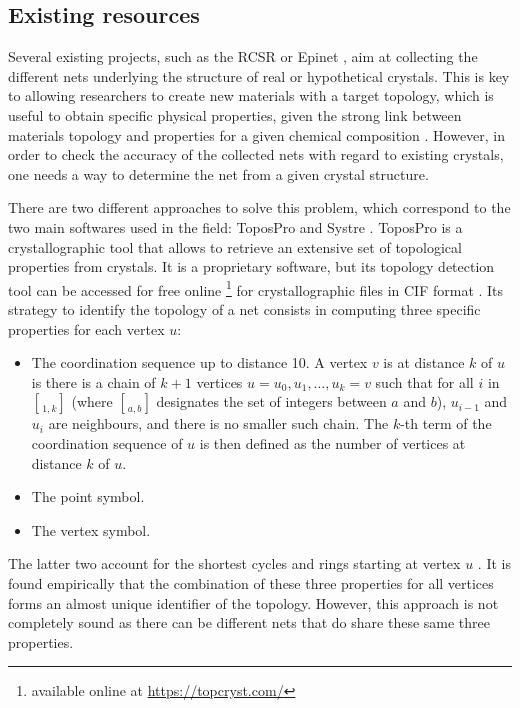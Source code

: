\documentclass[main.tex]{subfiles}
\begin{document}
\subsection{Existing resources}

Several existing projects, such as the RCSR \autocite{RCSR} or Epinet \autocite{Epinet0,EPINET}, aim at collecting the different nets underlying the structure of real or hypothetical crystals. This is key to allowing researchers to create new materials with a target topology, which is useful to obtain specific physical properties, given the strong link between materials topology and properties for a given chemical composition \autocite{ZIF}. However, in order to check the accuracy of the collected nets with regard to existing crystals, one needs a way to determine the net from a given crystal structure.

There are two different approaches to solve this problem, which correspond to the two main softwares used in the field: ToposPro \autocite{ToposPro,TOPOS} and Systre \autocite{Systre}. ToposPro is a crystallographic tool that allows to retrieve an extensive set of topological properties from crystals. It is a proprietary software, but its topology detection tool can be accessed for free online \autocite{TopCryst}\footnote{available online at \url{https://topcryst.com/}} for crystallographic files in CIF format \autocite{CIF}. Its strategy to identify the topology of a net consists in computing three specific properties for each vertex $u$:
\label{coordinationsequence}
\begin{itemize}
	\item The coordination sequence up to distance 10.
	A vertex $v$ is at distance $k$ of $u$ is there is a chain of $k+1$ vertices $u = u_0,u_1,\ldots,u_k = v$ such that for all $i$ in $\brack{1,k}$ (where $\brack{a,b}$ designates the set of integers between $a$ and $b$), $u_{i-1}$ and $u_i$ are neighbours, and there is no smaller such chain. The $k$-th term of the coordination sequence of $u$ is then defined as the number of vertices at distance $k$ of $u$.
	\item The point symbol.
	\item The vertex symbol.
\end{itemize}
The latter two account for the shortest cycles and rings starting at vertex $u$ \autocite{Definitions, Terminology}.
It is found empirically that the combination of these three properties for all vertices forms an almost unique identifier of the topology. However, this approach is not completely sound as there can be different nets that do share these same three properties.
\end{document}
